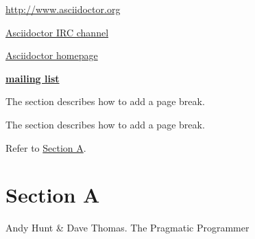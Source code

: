 \href{http://www.asciidoctor.org}{http://www.asciidoctor.org}

\href{irc://irc.freenode.org/#asciidoctor}{Asciidoctor IRC channel}

\href{view-source:asciidoctor.org}{Asciidoctor homepage}

\href{http://discuss.asciidoctor.org/}{\textbf{mailing list}}

The section \hyperlink{page-break}{} describes how to add a page break.

The section \hyperlink{page-break}{} describes how to add a page break.

Refer to \hyperlink{_section_a}{Section A}.
\section*{Section A}
\hypertarget{_section_a}{}

Andy Hunt & Dave Thomas. The Pragmatic Programmer
